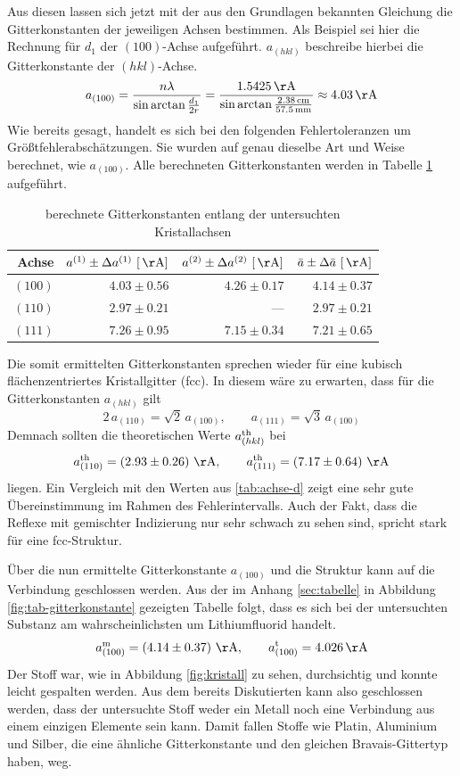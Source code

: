	Aus diesen lassen sich jetzt mit der aus den Grundlagen bekannten Gleichung die Gitterkonstanten der jeweiligen Achsen bestimmen.
	Als Beispiel sei hier die Rechnung für $d_1$ der $(100)$-Achse aufgeführt.
	$a_{(hkl)}$ beschreibe hierbei die Gitterkonstante der $(hkl)$-Achse.
	\[
		a_{(100)} = \frac{n\lambda}{\sin \arctan \frac{d_1}{2r}} = \frac{1.5425 \unit{\AA}}{\sin \arctan \frac{2.38\unit{cm}}{57.5\unit{mm} } } \approx 4.03 \unit{\AA}
	\]
	Wie bereits gesagt, handelt es sich bei den folgenden Fehlertoleranzen um Größtfehlerabschätzungen.
	Sie wurden auf genau dieselbe Art und Weise berechnet, wie $a_{(100)}$.
	Alle berechneten Gitterkonstanten werden in Tabelle \ref{tab:achse-a} aufgeführt.
	\begin{table}[H]
		\centering
		\begin{tabular}{r||r|r|r}
			Achse & $a^{(1)}\pm\Delta a^{(1)}\ [\unit{\AA}]$ & $a^{(2)}\pm\Delta a^{(2)}\ [\unit{\AA}]$ & $\bar{a}\pm\Delta \bar{a}\ [\unit{\AA}]$ \\
			\hline
			\hline
			$(100)$ & $4.03\pm 0.56$ & $4.26\pm 0.17$ & $4.14\pm 0.37$ \\
			$(110)$ & $2.97\pm 0.21$ & --- & $2.97\pm 0.21$ \\
			$(111)$ & $7.26\pm 0.95$ & $7.15\pm 0.34$ & $7.21\pm0.65$
		\end{tabular}
		\caption{berechnete Gitterkonstanten entlang der untersuchten Kristallachsen}
		\label{tab:achse-a}
	\end{table}

	Die somit ermittelten Gitterkonstanten sprechen wieder für eine kubisch flächenzentriertes Kristallgitter (fcc).
	In diesem wäre zu erwarten, dass für die Gitterkonstanten $a_{(hkl)}$ gilt
	\[
		2 \,a_{(110)} = \sqrt{2}\, a_{(100)},\qquad a_{(111)} = \sqrt{3}\, a_{(100)}
	\]
	Demnach sollten die theoretischen Werte $a_{(hkl)}^{\mathrm{th}}$ bei
	\[
		a_{(110)}^{\m{th}} = \curvb{2.93 \pm 0.26}\unit{\AA}, \qquad a_{(111)}^{\m{th}} = \curvb{7.17 \pm 0.64}\unit{\AA}
	\]
	liegen.
	Ein Vergleich mit den Werten aus \ref{tab:achse-d} zeigt eine sehr gute Übereinstimmung im Rahmen des Fehlerintervalls.
	Auch der Fakt, dass die Reflexe mit gemischter Indizierung nur sehr schwach zu sehen sind, spricht stark für eine fcc-Struktur.

	Über die nun ermittelte Gitterkonstante $a_{(100)}$ und die Struktur kann auf die Verbindung geschlossen werden.
	Aus der im Anhang \ref{sec:tabelle} in Abbildung \ref{fig:tab-gitterkonstante} gezeigten Tabelle folgt, dass es sich bei der untersuchten Substanz am wahrscheinlichsten um Lithiumfluorid handelt.
	\[
		a_{(100)}^{\m{m}} = \curvb{4.14 \pm 0.37}\unit{\AA}, \qquad a_{(100)}^{\m{t}} = 4.026 \unit{\AA}
	\]
	Der Stoff war, wie in Abbildung \ref{fig:kristall} zu sehen, durchsichtig und konnte leicht gespalten werden.
	Aus dem bereits Diskutierten kann also geschlossen werden, dass der untersuchte Stoff weder ein Metall noch eine Verbindung aus einem einzigen Elemente sein kann.
	Damit fallen Stoffe wie Platin, Aluminium und Silber, die eine ähnliche Gitterkonstante und den gleichen Bravais-Gittertyp haben, weg.

